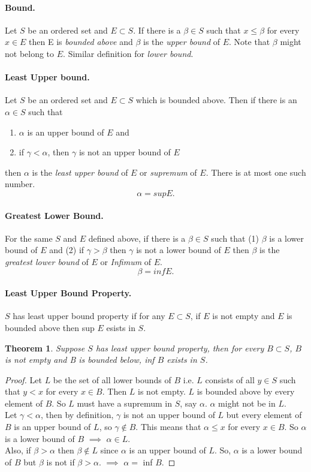 \documentclass{article}
\newtheorem{theorem}{Theorem}
\begin{document}
	\paragraph{Bound.} Let $S$ be an ordered set and $E \subset S$. If there is a $\beta \in S$ such that $x \leq \beta$ for every $x \in E$ then 
	E is \emph{bounded above} and $\beta$ is the \emph{upper bound} of $E$. Note that $\beta$ might not belong to $E$. Similar definition for 
	\emph{lower bound}.
	\paragraph{Least Upper bound. } Let $S$ be an ordered set and $E \subset S$ which is bounded above. Then if there is an $\alpha \in S$ such that
	\begin{enumerate}
		\item $\alpha$ is an upper bound of $E$ and 
		\item if $\gamma < \alpha$, then $\gamma$ is not an upper bound of $E$ 
	\end{enumerate}
	then $\alpha$ is the \emph{least upper bound} of $E$ or \emph{supremum} of $E$. There is at most one such number. \[\alpha = sup E.\]
	\paragraph{Greatest Lower Bound. } For the same $S$ and $E$ defined above, if there is a $\beta \in S$ such that (1) $\beta$ is a lower 
	bound of $E$ and (2) if $\gamma > \beta$ then $\gamma$ is not a lower bound of $E$ then $\beta$ is the \emph{greatest lower bound} of 
	$E$ or \emph{Infimum} of $E$. \[\beta = inf E.\]
	 \paragraph{Least Upper Bound Property.} $S$ has least upper bound property if for any $E \subset S$, if $E$ is not empty and $E$ is 
	 bounded above then sup $E$ esists in $S$.
	 \begin{theorem}
	 	Suppose $S$ has least upper bound property, then for every $B \subset S$, $B$ is not empty and B is bounded below, inf $B$ exists
	 	in $S$.
	 \end{theorem}
	 \begin{proof}
	 	Let $L$ be the set of all lower bounds of $B$ i.e. $L$ consists of all $y \in S$ such that $y < x$ for every $x \in B$. Then $L$ is not empty.
	 	$L$ is bounded above by every element of $B$. So $L$ must have a supremum in $S$, say $\alpha$. $\alpha$ might not be in $L$. \\
	 	Let $\gamma < \alpha$, then by definition, $\gamma$ is not an upper bound of $L$ but every element of $B$ is an upper bound of $L$, so
	 	$\gamma \notin B$. This means that $\alpha \leq x$ for every $x \in B$. So $\alpha$ is a lower bound of $B$ $\implies$ $\alpha \in L$.\\
	 	Also, if $\beta > \alpha$ then $\beta \notin L$ since $\alpha$ is an upper bound of $L$. So, $\alpha$ is a lower bound of $B$ but $\beta$ is 
	 	not if $\beta > \alpha$. $\implies$ $\alpha = $ inf $B$.  
	 \end{proof}
	
\end{document}
